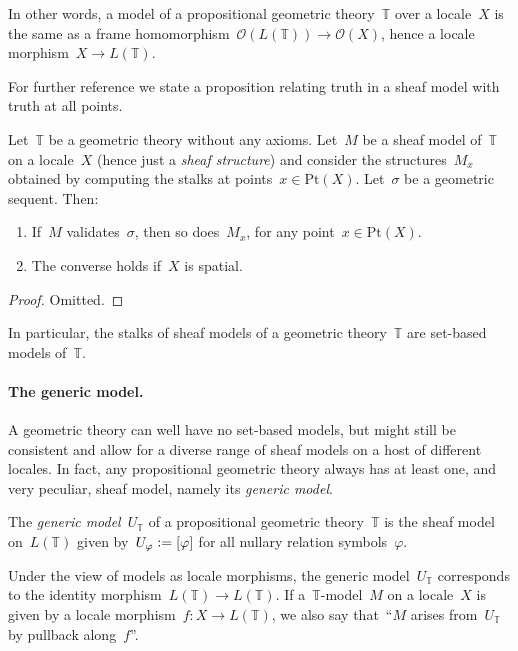 \documentclass{ws-rv9x6}
\renewcommand{\O}{\mathcal{O}}
\newcommand{\TT}{\mathbb{T}}
\newcommand{\defeq}{\vcentcolon=}
\renewcommand{\_}{\mathpunct{.}}
\newcommand{\?}{\,{:}\,}
\newcommand{\Pt}{\mathrm{Pt}}
\begin{document}
In other words, a model of a propositional geometric theory~$\TT$ over a
locale~$X$ is the same as a frame homomorphism~$\O(L(\TT)) \to \O(X)$, hence a
locale morphism~$X \to L(\TT)$.

For further reference we state a proposition relating truth in a sheaf model
with truth at all points.

\begin{proposition}\label{prop:at-points}
Let~$\TT$ be a geometric theory without any axioms. Let~$M$ be a sheaf model
of~$\TT$ on a locale~$X$ (hence just a \emph{sheaf structure}) and consider
the structures~$M_x$ obtained by computing the stalks at points~$x \in \Pt(X)$.
Let~$\sigma$ be a geometric sequent.
Then:
\begin{enumerate}
\item If~$M$ validates~$\sigma$, then so does~$M_x$, for any point~$x \in \Pt(X)$.
\item The converse holds if~$X$ is spatial.
\end{enumerate}
\end{proposition}

\begin{proof}Omitted.\end{proof}

In particular, the stalks of sheaf models of a geometric theory~$\TT$ are
set-based models of~$\TT$.

\paragraph{The generic model.}
A geometric theory can well have no set-based models, but might still be
consistent and allow for a diverse range of sheaf models on a host of different
locales. In fact, any propositional geometric theory always has at least one,
and very peculiar, sheaf model, namely its \emph{generic model}.

\begin{definition}The \emph{generic model}~$U_\TT$ of a propositional geometric
theory~$\TT$ is the sheaf model on~$L(\TT)$ given by~$U_\varphi \defeq
[\varphi]$ for all nullary relation symbols~$\varphi$.\end{definition}

Under the view of models as locale morphisms, the generic model~$U_\TT$
corresponds to the identity morphism~$L(\TT) \to L(\TT)$. If a~$\TT$-model~$M$ on
a locale~$X$ is given by a locale morphism~$f : X \to L(\TT)$, we also say
that~``$M$ arises from~$U_\TT$ by pullback along~$f$''.
\end{document}
